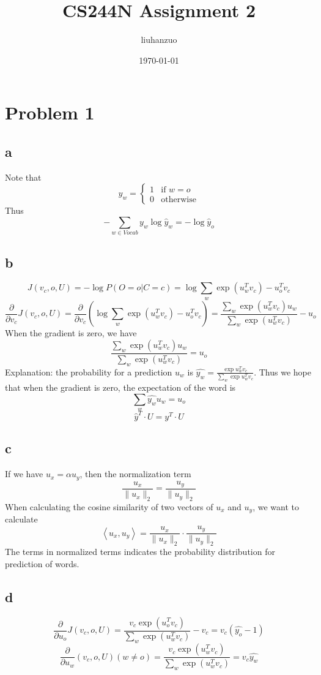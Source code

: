 \documentclass{article}
\begin{document}
\title{CS244N Assignment 2}
\author{liuhanzuo}
\date{\today}
\maketitle
\section{Problem 1}
\subsection*{a}
Note that
\[
    y_w = \begin{cases}
        1 & \text{if } w = o \\
        0 & \text{otherwise}
    \end{cases}
\]
Thus
\[
    -\sum_{w \in Vocab} y_w \log \hat{y}_w = -\log \hat{y}_o
\]
\subsection*{b}
\[
    J(v_c,o,U)=-\log P(O=o|C=c)= \log\sum_w\exp(u_w^T v_c)-u_o^T v_c
\]
\[
    \frac{\partial}{\partial v_c}J(v_c,o,U)=\frac{\partial}{\partial v_c}(\log\sum_w\exp(u_w^T v_c)-u_o^T v_c)=\frac{\sum_w\exp(u_w^T v_c)u_w}{\sum_w\exp(u_w^T v_c)}-u_o
\]
When the gradient is zero, we have
\[
    \frac{\sum_w\exp(u_w^T v_c)u_w}{\sum_w\exp(u_w^T v_c)}=u_o
\]
Explanation: the probability for a prediction $u_w$ is $\hat{y_w}=\frac{\exp{u_w^T v_c}}{\sum_w\exp{u_w^Tv_c}}$. Thus we hope that when the gradient is zero, the expectation of the word is 
\[
    \sum_w \hat{y_w} u_w = u_o
\]
\[
    \hat{y}^T\cdot U =y^T\cdot U 
\]
\subsection*{c}
If we have $u_x=\alpha u_y$, then the normalization term 
\[
    \frac{u_x}{\|u_x\|_2}=\frac{u_y}{\|u_y\|_2}
\]
When calculating the cosine similarity of two vectors of $u_x$ and $u_y$, we want to calculate
\[
    \left<u_x,u_y\right>=\frac{u_x}{\|u_x\|_2}\cdot\frac{u_y}{\|u_y\|_2}
\]
The terms in normalized terms indicates the probability distribution for prediction of words.
\subsection*{d}
\[
    \frac{\partial}{\partial u_o}J(v_c,o,U)=\frac{v_c\exp(u_o^T v_c)}{\sum_w\exp(u_w^T v_c)}-v_c=v_c(\hat{y_o}-1)
\]
\[
    \frac{\partial}{\partial u_w}(v_c,o,U)(w\neq o)=\frac{v_c\exp(u_w^T v_c)}{\sum_w\exp(u_w^T v_c)}=v_c \hat{y_w}
\]
\end{document}
